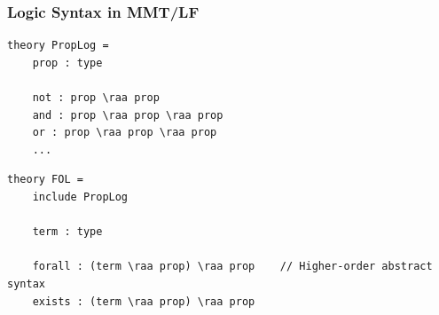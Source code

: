 \documentclass{beamer}
\begin{document}
% 

\begin{frame}[fragile]
    \frametitle{Logic Syntax in MMT/LF}
    \begin{minipage}{0.7\textwidth}
        \begin{lstlisting}[language=MMT]
theory PropLog =
    prop : type

    not : prop \raa prop
    and : prop \raa prop \raa prop
    or : prop \raa prop \raa prop
    ...
        \end{lstlisting}

        \begin{lstlisting}[language=MMT]
theory FOL =
    include PropLog

    term : type

    forall : (term \raa prop) \raa prop    // Higher-order abstract syntax
    exists : (term \raa prop) \raa prop
        \end{lstlisting}
    \end{minipage}
    \begin{minipage}{0.1\textwidth}
    \end{minipage}
\end{frame}
\end{document}
